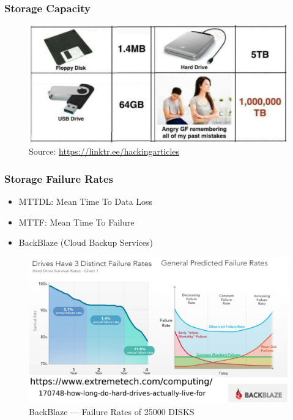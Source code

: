 \documentclass[aspectratio=169, xcolor=table, notheorems, hyperref={pdfpagelabels=false}]{beamer}
\begin{document}
\begin{frame}[fragile]
\frametitle{Storage Capacity}
\begin{figure}
\includegraphics[width=0.90\linewidth]{os-Storage-HackingArticles}
\caption{Source: \url{https://linktr.ee/hackingarticles}}
\end{figure}
\end{frame}

\begin{frame}
\frametitle{Storage Failure Rates}
\begin{itemize}
\item MTTDL: Mean Time To Data Loss
\item MTTF: Mean Time To Failure
\item BackBlaze (Cloud Backup Services)
\end{itemize}
\begin{figure}
\includegraphics[width=0.60\linewidth]{os-extreme-tech}
\caption{BackBlaze --- Failure Rates of 25000 DISKS}
\end{figure}
\end{frame}

\end{document}
